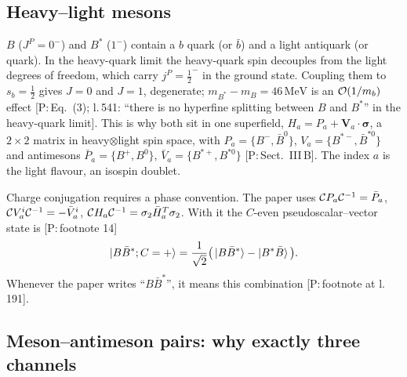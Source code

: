 \documentclass[11pt,a4paper]{article}
\newcommand{\tagP}[1]{\textcolor{blue!65!black}{\textsf{\small[P:\,#1]}}}
\renewcommand{\MeV}{\,\mathrm{MeV}}
\begin{document}
\subsection{Heavy--light mesons}
\label{sec:qn-B}

$B$ ($J^P=0^-$) and $B^*$ ($1^-$) contain a $b$ quark (or $\bar b$) and a light antiquark (or quark). In the heavy-quark limit the heavy-quark spin decouples from the light degrees of freedom, which carry $j^P=\frac12^-$ in the ground state. Coupling them to $s_b=\frac12$ gives $J=0$ and $J=1$, degenerate; $m_{B^*}-m_B=46\MeV$ is an ${\cal O}(1/m_b)$ effect \tagP{Eq.~(3); l.\,541: ``there is no hyperfine splitting between $B$ and $B^*$'' in the heavy-quark limit}. This is why both sit in one superfield, $H_a=P_a+\bm V_a\cdot\bm\sigma$, a $2\times2$ matrix in heavy$\otimes$light spin space, with $P_a=\{B^-,\bar B^0\}$, $V_a=\{B^{*-},\bar B^{*0}\}$ and antimesons $\bar P_a=\{B^+,B^0\}$, $\bar V_a=\{B^{*+},B^{*0}\}$ \tagP{Sect.~III\,B}. The index $a$ is the light flavour, an isospin doublet.

Charge conjugation requires a phase convention. The paper uses ${\cal C}P_a{\cal C}^{-1}=\bar P_a$, ${\cal C}V_a^i{\cal C}^{-1}=-\bar V_a^i$, ${\cal C}H_a{\cal C}^{-1}=\sigma_2\bar H_a^T\sigma_2$. With it the $C$-even pseudoscalar--vector state is \tagP{footnote 14}
\begin{equation}
\ket{B\bar B^*;C=+}=\frac{1}{\sqrt2}\big(\ket{B\bar B^*}-\ket{B^*\bar B}\big).
\end{equation}
Whenever the paper writes ``$B\bar B^*$'', it means this combination \tagP{footnote at l.\,191}.

\subsection{Meson--antimeson pairs: why exactly three channels}
\label{sec:qn-pairs}
\end{document}
